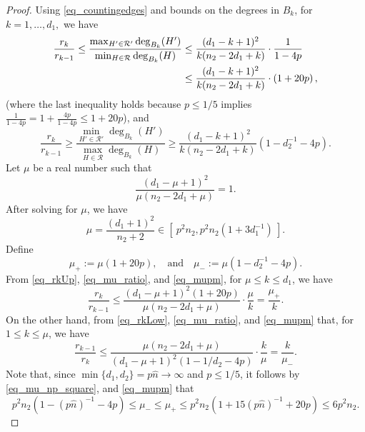 \documentclass[12pt,reqno]{amsart}
\newcommand{\rc}{{\mathcal{R}}}
\theoremstyle{definition}
\begin{document}
\begin{proof}
Using \eqref{eq_countingedges} and bounds on the degrees in $B_k$, for $k = 1, \dots, d_1,$ we have
\begin{align}
  \notag \frac{r_k}{r_{k-1}} \le \frac{\max_{H' \in \rc' }\deg_{B_k}(H')}{\min_{H \in \rc} \deg_{B_k}(H)} &\le \frac{(d_1 - k + 1)^2}{k(n_2 - 2d_1 + k)}\cdot\frac{1}{1 - 4p} \\
 \label{eq_rkUp} &\le \frac{(d_1 - k + 1)^2}{k(n_2 - 2d_1 + k)} \cdot \left( 1 + 20p \right),
\end{align}
(where the last inequality holds because $p \le 1/5$ implies $\frac{1}{1 - 4p} = 1 + \frac{4p}{1 - 4p} \le 1 + 20p$), and
\begin{equation}
  \label{eq_rkLow}
  \frac{r_k}{r_{k-1}} \ge \frac{\min_{H' \in \rc' }\deg_{B_k}(H')}{\max_{H \in \rc} \deg_{B_k}(H)} \ge \frac{(d_1 - k + 1)^2}{k(n_2 - 2d_1 + k)} \left( 1 - d_2^{-1}  -4p \right).
	\end{equation}
Let $\mu$ be a real number such that
\begin{equation}
  \label{eq_mu_ratio}
\frac{(d_1 - \mu + 1)^2}{\mu(n_2 - 2d_1 + \mu)} = 1.
\end{equation}
 After solving for $\mu$, we have
\begin{equation}
  \label{eq_mu_np_square}
	\mu = \frac{(d_1 + 1)^2}{n_2 + 2} \in [\:p^2n_2, p^2n_2(1 + 3d_1^{-1})\:].
	\end{equation}
  Define
	\begin{equation}
		\label{eq_mupm}
		\mu_+ := \mu(1 + 20p), \quad \text{and} \quad \mu_- := \mu(1 - d_2^{-1} -4p).
	\end{equation}
	From \eqref{eq_rkUp}, \eqref{eq_mu_ratio}, and \eqref{eq_mupm}, for $\mu \le k \le d_1$, we have
	\begin{equation*}
		\frac{r_k}{r_{k-1}} \le \frac{(d_1 - \mu + 1)^2\left( 1 + 20p \right)}{\mu (n_2 - 2d_1 + \mu)} \cdot \frac{\mu}{k} = \frac{\mu_+}{k}.
	\end{equation*}
	On the other hand, from \eqref{eq_rkLow}, \eqref{eq_mu_ratio}, and \eqref{eq_mupm} that, for $1\le k \le \mu$, we have
	\begin{equation*}
	  \frac{r_{k-1}}{r_k} \le \frac{\mu (n_2 - 2d_1 + \mu)}{(d_1 - \mu + 1)^2\left( 1 - 1/d_2 -4p \right)} \cdot \frac{k}{\mu} = \frac{k}{\mu_-}.
	\end{equation*}
Note that, since $\min\{d_1,d_2\} = p\hat n  \to \infty$ and $p\le1/5$, it follows by \eqref{eq_mu_np_square}, and \eqref{eq_mupm} that
\begin{equation}
\label{eq_mu_pm_ptwon}
  p^2n_2(1 - (p\hat n)^{-1} - 4p) \le \mu_-\le \mu_+\le p^2n_2(1 + 15(p\hat n)^{-1} + 20p)\le 6p^2n_2 .

\end{equation}
\end{proof}
\end{document}
